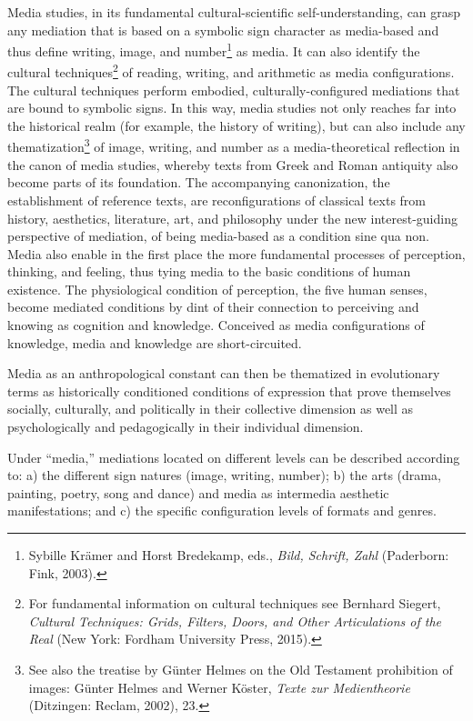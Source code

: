 \documentclass{tufte-handout}
\begin{document}
Media studies, in its fundamental cultural-scientific
self-understanding, can grasp any mediation that is based on a symbolic
sign character as media-based and thus define writing, image, and
number\footnote{Sybille Krämer and Horst Bredekamp, eds., \emph{Bild,
  Schrift, Zahl} (Paderborn: Fink, 2003).} as media. It can also
identify the cultural techniques\footnote{For fundamental information on
  cultural techniques see Bernhard Siegert, \emph{Cultural Techniques:
  Grids, Filters, Doors, and Other Articulations of the Real} (New York:
  Fordham University Press, 2015).} of reading, writing, and arithmetic
as media configurations. The cultural techniques perform embodied,
culturally-configured mediations that are bound to symbolic signs. In
this way, media studies not only reaches far into the historical realm
(for example, the history of writing), but can also include any
thematization\footnote{See also the treatise by Günter Helmes on the Old
  Testament prohibition of images: Günter Helmes and Werner Köster,
  \emph{Texte zur Medientheorie} (Ditzingen: Reclam, 2002), 23.} of
image, writing, and number as a media-theoretical reflection in the
canon of media studies, whereby texts from Greek and Roman antiquity
also become parts of its foundation. The accompanying canonization, the
establishment of reference texts, are reconfigurations of classical
texts from history, aesthetics, literature, art, and philosophy under
the new interest-guiding perspective of mediation, of being media-based
as a condition sine qua non. Media also enable in the first place the
more fundamental processes of perception, thinking, and feeling, thus
tying media to the basic conditions of human existence. The
physiological condition of perception, the five human senses, become
mediated conditions by dint of their connection to perceiving and
knowing as cognition and knowledge. Conceived as media configurations of
knowledge, media and knowledge are short-circuited.

Media as an anthropological constant can then be thematized in
evolutionary terms as historically conditioned conditions of expression
that prove themselves socially, culturally, and politically in their
collective dimension as well as psychologically and pedagogically in
their individual dimension.

Under ``media,'' mediations located on different levels can be described
according to: a) the different sign natures (image, writing, number); b)
the arts (drama, painting, poetry, song and dance) and media as
intermedia aesthetic manifestations; and c) the specific configuration
levels of formats and genres.
\end{document}
